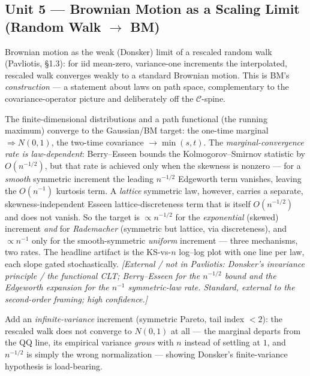 \documentclass[11pt]{article}
\newcommand{\extnote}[1]{{\small\color{extgray}\emph{[External / not in Pavliotis: #1]}}}
\newcommand{\pav}[1]{{\small\color{hubblue}(Pavliotis, #1)}}
\newenvironment{brief}{%
  \begin{description}[style=sameline,leftmargin=2.3cm,font=\bfseries\color{hubblue}]
}{%
  \end{description}
}
\begin{document}
\subsection*{Unit 5 --- Brownian Motion as a Scaling Limit (Random Walk $\to$ BM)}
\begin{brief}
\item[Idea] Brownian motion as the weak (Donsker) limit of a rescaled random walk \pav{\S1.3}: for
iid mean-zero, variance-one increments the interpolated, rescaled walk converges weakly to a standard
Brownian motion. This is BM's \emph{construction} --- a statement about laws on path space,
complementary to the covariance-operator picture and deliberately off the $\mathcal{C}$-spine.
\item[Proves] The finite-dimensional distributions and a path functional (the running maximum)
converge to the Gaussian/BM target: the one-time marginal $\Rightarrow N(0,1)$, the two-time
covariance $\to\min(s,t)$. The \emph{marginal-convergence rate is law-dependent}: Berry--Esseen bounds
the Kolmogorov--Smirnov statistic by $O(n^{-1/2})$, but that rate is achieved only when the skewness is
nonzero --- for a \emph{smooth} symmetric increment the leading $n^{-1/2}$ Edgeworth term vanishes,
leaving the $O(n^{-1})$ kurtosis term. A \emph{lattice} symmetric law, however, carries a separate,
skewness-independent Esseen lattice-discreteness term that is itself $O(n^{-1/2})$ and does not vanish.
So the target is $\propto n^{-1/2}$ for the \emph{exponential} (skewed) increment \emph{and} for
\emph{Rademacher} (symmetric but lattice, via discreteness), and $\propto n^{-1}$ only for the
smooth-symmetric \emph{uniform} increment --- three mechanisms, two rates. The headline artifact is
the KS-vs-$n$ log--log plot with one line per law, each slope gated stochastically. \extnote{Donsker's
invariance principle / the functional CLT; Berry--Esseen for the $n^{-1/2}$ bound and the Edgeworth
expansion for the $n^{-1}$ symmetric-law rate. Standard, external to the second-order framing;
high confidence.}
\item[Falsifier] Add an \emph{infinite-variance} increment (symmetric Pareto, tail index $<2$): the
rescaled walk does not converge to $N(0,1)$ at all --- the marginal departs from the QQ line, its
empirical variance \emph{grows} with $n$ instead of settling at $1$, and $n^{-1/2}$ is simply the
wrong normalization --- showing Donsker's finite-variance hypothesis is load-bearing.

\end{brief}
\end{document}
